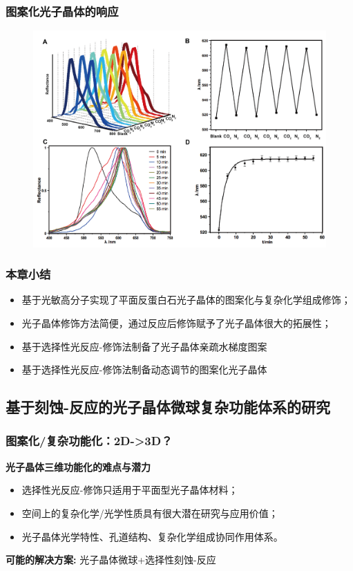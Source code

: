 \documentclass{beamer}
\begin{document}
\begin{frame}
  \frametitle{图案化光子晶体的响应}
  \begin{figure}
  \centering
  \includegraphics[width=0.85\linewidth]{figures/ch3-saturation.png}
  \end{figure}
\end{frame}

\begin{frame}
  \frametitle{本章小结}
  \begin{itemize}
    \item
    基于光敏高分子实现了平面反蛋白石光子晶体的图案化与复杂化学组成修饰；
    \item
    光子晶体修饰方法简便，通过反应后修饰赋予了光子晶体很大的拓展性；
    \item
    基于选择性光反应-修饰法制备了光子晶体亲疏水梯度图案
    \item
    基于选择性光反应-修饰法制备动态调节的图案化光子晶体
  \end{itemize}
\end{frame}

\subsection{基于刻蚀-反应的光子晶体微球复杂功能体系的研究}

\begin{frame}
  \frametitle{图案化/复杂功能化：2D->3D？}
  \textcolor{tsinghua}{\textbf{光子晶体三维功能化的难点与潜力}}
  \begin{itemize}
    \item
    选择性光反应-修饰只适用于平面型光子晶体材料；
    \item
    空间上的复杂化学/光学性质具有很大潜在研究与应用价值；
    \item
    光子晶体光学特性、孔道结构、复杂化学组成协同作用体系。
  \end{itemize}
  \pause
  \textcolor{tsinghua}{\textbf{可能的解决方案:}}
  光子晶体微球+选择性刻蚀-反应
\end{frame}
\end{document}
